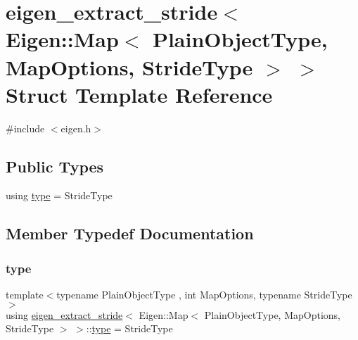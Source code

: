 \hypertarget{structeigen__extract__stride_3_01_eigen_1_1_map_3_01_plain_object_type_00_01_map_options_00_01_stride_type_01_4_01_4}{}\section{eigen\+\_\+extract\+\_\+stride$<$ Eigen\+::Map$<$ Plain\+Object\+Type, Map\+Options, Stride\+Type $>$ $>$ Struct Template Reference}
\label{structeigen__extract__stride_3_01_eigen_1_1_map_3_01_plain_object_type_00_01_map_options_00_01_stride_type_01_4_01_4}


{\ttfamily \#include $<$eigen.\+h$>$}

\subsection*{Public Types}
\begin{DoxyCompactItemize}
\item 
using \mbox{\hyperlink{structeigen__extract__stride_3_01_eigen_1_1_map_3_01_plain_object_type_00_01_map_options_00_01_stride_type_01_4_01_4_a5b20e9b2e74fa3bed76831203ba87a9f}{type}} = Stride\+Type
\end{DoxyCompactItemize}


\subsection{Member Typedef Documentation}
\mbox{\label{structeigen__extract__stride_3_01_eigen_1_1_map_3_01_plain_object_type_00_01_map_options_00_01_stride_type_01_4_01_4_a5b20e9b2e74fa3bed76831203ba87a9f}} 
\subsubsection{\texorpdfstring{type}{type}}
{\footnotesize\ttfamily template$<$typename Plain\+Object\+Type , int Map\+Options, typename Stride\+Type $>$ \\
using \mbox{\hyperlink{structeigen__extract__stride}{eigen\+\_\+extract\+\_\+stride}}$<$ Eigen\+::\+Map$<$ Plain\+Object\+Type, Map\+Options, Stride\+Type $>$ $>$\+::\mbox{\hyperlink{structeigen__extract__stride_3_01_eigen_1_1_map_3_01_plain_object_type_00_01_map_options_00_01_stride_type_01_4_01_4_a5b20e9b2e74fa3bed76831203ba87a9f}{type}} =  Stride\+Type}



